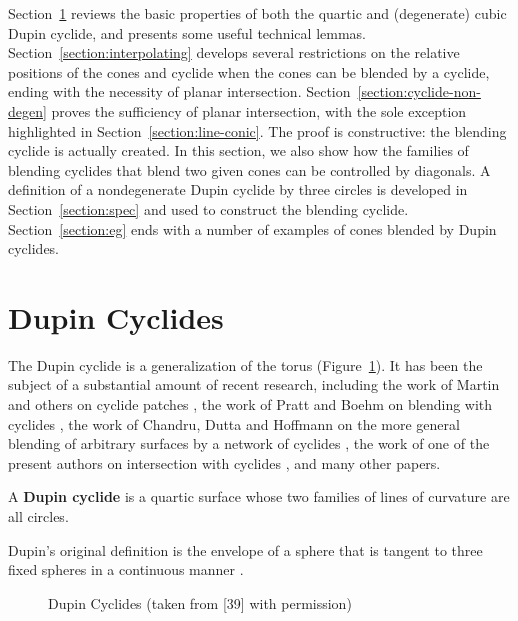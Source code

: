 Section~\ref{section:basic} reviews the basic properties of both
the quartic and (degenerate) cubic Dupin cyclide,
and presents some useful technical lemmas.
Section~\ref{section:interpolating} develops several 
restrictions on the relative positions of the cones and cyclide
when the cones can be blended by a cyclide, ending with the necessity
of planar intersection.
Section~\ref{section:cyclide-non-degen} proves the
sufficiency of planar intersection,
with the sole exception highlighted in Section~\ref{section:line-conic}.
The proof is constructive: the blending cyclide is actually created.
In this section, we also show how the families of blending
cyclides that blend two given cones can be controlled by diagonals.
A definition of a nondegenerate Dupin cyclide by three circles is developed in 
Section~\ref{section:spec} and used to construct the blending cyclide.
Section~\ref{section:eg} ends with a number of examples of cones blended
by Dupin cyclides.

\section{Dupin Cyclides}
\label{section:basic}

The Dupin cyclide is a generalization of the torus (Figure~\ref{fig:cyclides}).
It has been the subject of a substantial amount of recent
research, including the work of Martin and others on cyclide patches
\cite{depont:1984,martin:1982,nutbourne-martin:1988,sharrock:1985}, 
the work of Pratt and Boehm on blending with cyclides 
\cite{boehm:1990,pratt:1989,pratt:1990}, 
the work of Chandru, Dutta and Hoffmann 
on the more general blending of arbitrary surfaces by a network of cyclides 
\cite{chandru-dutta-hoffmann:1989,chandru-dutta-hoffmann:1990,dutta:1989},
the work of one of the present authors on intersection with cyclides
\cite{jj92}, and many other papers.

\begin{definition}
A {\bf Dupin cyclide} is a quartic surface whose two families of lines of 
curvature are all circles.  
\end{definition}

Dupin's original definition is the envelope of a sphere that is tangent to
three fixed spheres in a continuous manner \cite{maxwell:1868}.

\begin{figure}
\vspace{18.5cm}
\caption{Dupin Cyclides (taken from [39] with permission)}
\label{fig:cyclides}
\end{figure}

